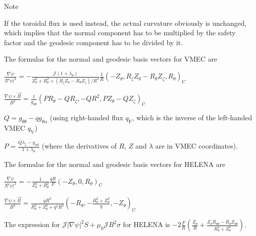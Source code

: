 \begin{DoxyNote}{Note}

\begin{DoxyEnumerate}
\item If the toroidal flux is used instead, the actual curvature obviously is unchanged, which implies that the normal component has to be multiplied by the safety factor and the geodesic component has to be divided by it.
\item The formulas for the normal and geodesic basis vectors for V\+M\+EC are
\begin{DoxyItemize}
\item $\frac{\nabla \psi}{\left|\nabla\psi\right|^2} = -\frac{\mathcal{J} \left(1 + \lambda_\theta\right)} {Z_\theta^2 + R_\theta^2 + \left(R_\zeta Z_\theta - R_\theta Z_\zeta \right)/R^2} \frac{1}{R} \left( -Z_\theta , R_\zeta Z_\theta - R_\theta Z_\zeta, R_\theta\right)_\text{C}$
\item $\frac{\nabla \psi \times \vec{B}}{B^2} = \frac{1}{g_{\theta\theta}} \left(P R_\theta - Q R_\zeta, -Q R^2, P Z_\theta - Q Z_\zeta\right)_\text{C}$
\item $Q = g_{\theta\theta} - q g_{\theta\alpha}$ (using right-\/handed flux $q_\text{F}$, which is the inverse of the left-\/handed V\+M\+EC $q_\text{V}$)
\item $P = \frac{Q \lambda_\zeta - g_{\alpha\theta}}{1+\lambda_\theta}$ (where the derivatives of $R$, $Z$ and $\lambda$ are in V\+M\+EC coordinates).
\end{DoxyItemize}
\item The formulas for the normal and geodesic basis vectors for H\+E\+L\+E\+NA are
\begin{DoxyItemize}
\item $\frac{\nabla \psi}{\left|\nabla\psi\right|^2} = -\frac{1}{Z_\theta^2 + R_\theta^2} \frac{q R}{F} \left( -Z_\theta , 0, R_\theta\right)_\text{C}$
\item $\frac{\nabla \psi \times \vec{B}}{B^2} = \frac{q R^2}{R_\theta^2 + Z_\theta^2 + q^2 R^2} \left(-R_\theta, -\frac{R_\theta^2 + Z_\theta^2}{q}, -Z_\theta\right)_\text{C}$
\end{DoxyItemize}
\item The expression for $\mathcal{J}\left|\nabla \psi\right|^2 S + \mu_0 \mathcal{J}B^2 \sigma$ for H\+E\+L\+E\+NA is $- 2 \frac{F}{R} \left( \frac{Z_\theta}{R} + \frac{Z_\theta R_{\theta\theta} - R_\theta Z_{\theta\theta}}{R_\theta^2 + Z_\theta^2} \right)$.
\end{DoxyEnumerate}
\end{DoxyNote}

